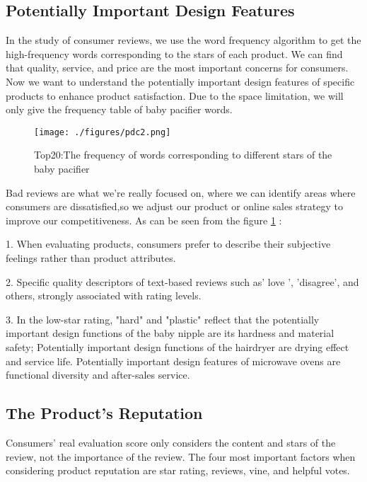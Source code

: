 \documentclass{mcmthesis}
\newcommand{\upcite}[1]{\textsuperscript{\textsuperscript{\cite{#1}}}}
\begin{document}
\subsection{Potentially Important Design Features}

In the study of consumer reviews, we use the word frequency algorithm to get the high-frequency words corresponding to the stars of each product. We can find that quality, service, and price are the most important concerns for consumers. Now we want to understand the potentially important design features of specific products to enhance product satisfaction. Due to the space limitation, we will only give the frequency table of baby pacifier words.

\begin{figure}[h]
	\centering
	\texttt{[image: ./figures/pdc2.png]}
	\caption{Top20:The frequency of words corresponding to different stars of the baby pacifier} \label{pdc1}
\end{figure}

Bad reviews are what we're really focused on, where we can identify areas where consumers are dissatisfied,so we adjust our product or online sales strategy to improve our competitiveness. As can be seen from the figure \ref{pdc1} :

1. When evaluating products, consumers prefer to describe their subjective feelings rather than product attributes.

2. Specific quality descriptors of text-based reviews such as' love ', 'disagree', and others, strongly associated with rating levels.

3. In the low-star rating, "hard" and "plastic" reflect that the potentially important design functions of the baby nipple are its hardness and material safety; Potentially important design functions of the hairdryer are drying effect and service life. Potentially important design features of microwave ovens are functional diversity and after-sales service.

\subsection{The Product’s Reputation}

Consumers' real evaluation score only considers the content and stars of the review, not the importance of the review. The four most important factors when considering product reputation are star rating, reviews, vine, and helpful votes\upcite{WannThe}.
\end{document}
